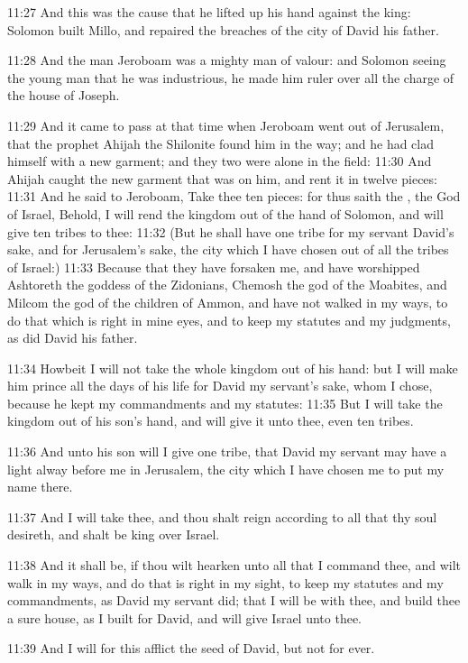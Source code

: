 11:27 And this was the cause that he lifted up his hand against the
king: Solomon built Millo, and repaired the breaches of the city of
David his father.

11:28 And the man Jeroboam was a mighty man of valour: and Solomon
seeing the young man that he was industrious, he made him ruler over
all the charge of the house of Joseph.

11:29 And it came to pass at that time when Jeroboam went out of
Jerusalem, that the prophet Ahijah the Shilonite found him in the way;
and he had clad himself with a new garment; and they two were alone in
the field: 11:30 And Ahijah caught the new garment that was on him,
and rent it in twelve pieces: 11:31 And he said to Jeroboam, Take thee
ten pieces: for thus saith the \LORD, the God of Israel, Behold, I will
rend the kingdom out of the hand of Solomon, and will give ten tribes
to thee: 11:32 (But he shall have one tribe for my servant David's
sake, and for Jerusalem's sake, the city which I have chosen out of
all the tribes of Israel:) 11:33 Because that they have forsaken me,
and have worshipped Ashtoreth the goddess of the Zidonians, Chemosh
the god of the Moabites, and Milcom the god of the children of Ammon,
and have not walked in my ways, to do that which is right in mine
eyes, and to keep my statutes and my judgments, as did David his
father.

11:34 Howbeit I will not take the whole kingdom out of his hand: but I
will make him prince all the days of his life for David my servant's
sake, whom I chose, because he kept my commandments and my statutes:
11:35 But I will take the kingdom out of his son's hand, and will give
it unto thee, even ten tribes.

11:36 And unto his son will I give one tribe, that David my servant
may have a light alway before me in Jerusalem, the city which I have
chosen me to put my name there.

11:37 And I will take thee, and thou shalt reign according to all that
thy soul desireth, and shalt be king over Israel.

11:38 And it shall be, if thou wilt hearken unto all that I command
thee, and wilt walk in my ways, and do that is right in my sight, to
keep my statutes and my commandments, as David my servant did; that I
will be with thee, and build thee a sure house, as I built for David,
and will give Israel unto thee.

11:39 And I will for this afflict the seed of David, but not for ever.

